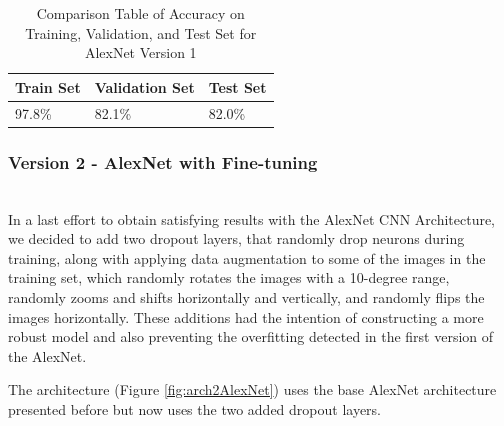 \documentclass[conference]{IEEEtran}
\begin{document}
\begin{table}[H]
    \centering
    \caption{Comparison Table of Accuracy on Training, Validation, and Test Set for AlexNet Version 1}
    \renewcommand{\arraystretch}{1.5}
    \begin{tabularx}{0.8\linewidth}{|X|X|X|}
    \hline
    \cellcolor[HTML]{EFEFEF}\textbf{Train Set} & \cellcolor[HTML]{EFEFEF}\textbf{Validation Set} & \cellcolor[HTML]{EFEFEF}\textbf{Test Set} \\ \hline
     97.8\%  & 82.1\%  & 82.0\%\\ \hline
    \end{tabularx}
    \label{tab:accMobileNetV2_1}
\end{table}

\subsubsection{Version 2 - AlexNet with Fine-tuning}
\hfill\\

In a last effort to obtain satisfying results with the AlexNet CNN Architecture, we decided to add two dropout layers, that randomly drop neurons during training, along with applying data augmentation to some of the images in the training set, which randomly rotates the images with a 10-degree range, randomly zooms and shifts horizontally and vertically, and randomly flips the images horizontally. These additions had the intention of constructing a more robust model and also preventing the overfitting detected in the first version of the AlexNet.

The architecture (Figure \ref{fig:arch2AlexNet}) uses the base AlexNet architecture presented before but now uses the two added dropout layers.
\end{document}
